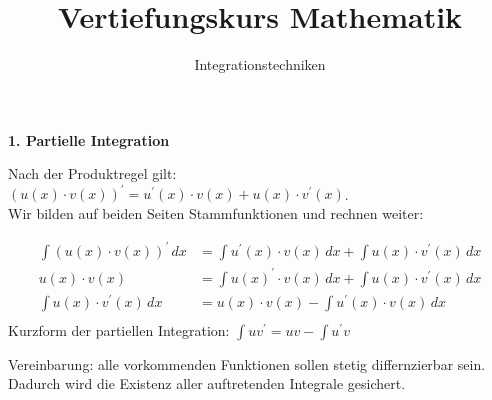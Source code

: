 \usepackage[ngerman]{babel}
\usepackage[utf8]{inputenc}
\usepackage{amsmath}
\usepackage{amssymb}
\usepackage{listings} 
\usepackage{stmaryrd}
\lstset{language=Python, tabsize=4, showstringspaces=false,basicstyle=\footnotesize,mathescape=true} 
\usepackage{mathtools}
\usepackage{ulem}
\usepackage{tikz}

\parskip 10pt
\newcommand{\ggT}{\operatorname{ggT}}
\newcommand{\Mod}[3]{#1\equiv#2\text{ mod }#3}
\newcommand{\tmod}{\text{ mod }}
\newcommand{\ph}{\frac{\pi}{2}}



\title{Vertiefungskurs Mathematik}   
\author{Integrationstechniken} 
\date{}
\frame{\titlepage} 

\begin{frame}[fragile]

\textbf{1. Partielle Integration}  

Nach der Produktregel gilt: $(u(x)\cdot v(x))^{\prime} = u^{\prime}(x) \cdot v(x) + u(x) \cdot v^{\prime}(x)$. \\ \pause
Wir bilden auf beiden Seiten Stammfunktionen und rechnen weiter: \\ \pause

\begin{align*}
\displaystyle\int (u(x)\cdot v(x))^{\prime} \,dx &= \displaystyle\int u^{\prime}(x) \cdot v(x) \,dx + \displaystyle\int u(x) \cdot v^{\prime}(x) \,dx \\  
u(x)\cdot v(x) &= \displaystyle\int u(x)^{\prime} \cdot v(x) \,dx + \displaystyle\int u(x) \cdot v^{\prime}(x)\,dx \\
 \displaystyle\int u(x) \cdot v^{\prime}(x) \,dx  &= u(x)\cdot v(x) -  \displaystyle\int u^{\prime}(x) \cdot v(x) \,dx\\
 \end{align*}  \pause
 Kurzform der partiellen Integration: $\int u v^{\prime} = uv - \int u^{\prime} v$ \pause
 
\footnotesize
Vereinbarung: alle vorkommenden Funktionen sollen stetig differnzierbar sein. Dadurch wird die Existenz aller auftretenden Integrale gesichert.
\normalsize
\end{frame}

